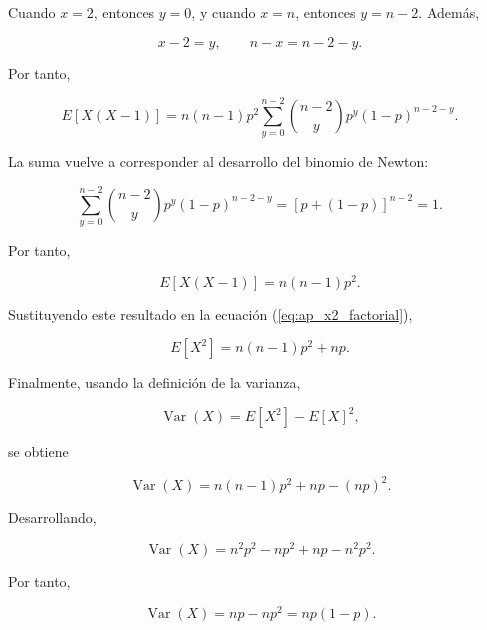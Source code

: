 \documentclass[12pt,a4paper]{article}
\begin{document}
Cuando $x=2$, entonces $y=0$, y cuando $x=n$, entonces $y=n-2$. Además,

\begin{equation}
    x-2=y,
    \qquad
    n-x=n-2-y.
\end{equation}

Por tanto,

\begin{equation}
    E[X(X-1)]
    =
    n(n-1)p^2
    \sum_{y=0}^{n-2}
    \binom{n-2}{y}
    p^y(1-p)^{n-2-y}.
\end{equation}

La suma vuelve a corresponder al desarrollo del binomio de Newton:

\begin{equation}
    \sum_{y=0}^{n-2}
    \binom{n-2}{y}
    p^y(1-p)^{n-2-y}
    =
    \left[p+(1-p)\right]^{n-2}
    =
    1.
\end{equation}

Por tanto,

\begin{equation}
    E[X(X-1)]=n(n-1)p^2.
\end{equation}

Sustituyendo este resultado en la ecuación (\ref{eq:ap_x2_factorial}),

\begin{equation}
    E[X^2]
    =
    n(n-1)p^2+np.
\end{equation}

Finalmente, usando la definición de la varianza,

\begin{equation}
    \operatorname{Var}(X)
    =
    E[X^2]-E[X]^2,
\end{equation}

se obtiene

\begin{equation}
    \operatorname{Var}(X)
    =
    n(n-1)p^2+np-(np)^2.
\end{equation}

Desarrollando,

\begin{equation}
    \operatorname{Var}(X)
    =
    n^2p^2-np^2+np-n^2p^2.
\end{equation}

Por tanto,

\begin{equation}
    \operatorname{Var}(X)
    =
    np-np^2
    =
    np(1-p).
    \label{eq:ap_varianza_binomial}
\end{equation}
\end{document}
